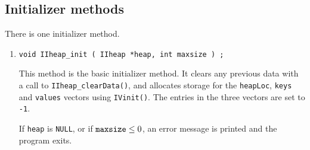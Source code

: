 \subsection{Initializer methods}
\label{subsection:IIheap:proto:initializers}
\par
There is one initializer method.
\par
\begin{enumerate}
\item
\begin{verbatim}
void IIheap_init ( IIheap *heap, int maxsize ) ;
\end{verbatim}
This method is the basic initializer method.
It clears any previous data with a call to 
{\tt IIheap\_clearData()}, 
and allocates storage for
the {\tt heapLoc}, {\tt keys} and {\tt values} vectors using 
{\tt IVinit()}.
The entries in the three vectors are set to {\tt -1}.
\par {}
If {\tt heap} is {\tt NULL},
or if ${\tt maxsize} \le 0$,
an error message is printed and the program exits.
\end{enumerate}
\par
